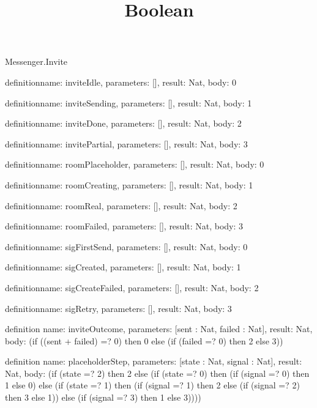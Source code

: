 \begin{lexlean}{Messenger.Invite}
\title{Boolean}
\begin{semanticmodule}
definition{name: inviteIdle, parameters: [], result: Nat, body: 0}

definition{name: inviteSending, parameters: [], result: Nat, body: 1}

definition{name: inviteDone, parameters: [], result: Nat, body: 2}

definition{name: invitePartial, parameters: [], result: Nat, body: 3}

definition{name: roomPlaceholder, parameters: [], result: Nat, body: 0}

definition{name: roomCreating, parameters: [], result: Nat, body: 1}

definition{name: roomReal, parameters: [], result: Nat, body: 2}

definition{name: roomFailed, parameters: [], result: Nat, body: 3}

definition{name: sigFirstSend, parameters: [], result: Nat, body: 0}

definition{name: sigCreated, parameters: [], result: Nat, body: 1}

definition{name: sigCreateFailed, parameters: [], result: Nat, body: 2}

definition{name: sigRetry, parameters: [], result: Nat, body: 3}

definition{
  name: inviteOutcome,
  parameters: [sent : Nat, failed : Nat],
  result: Nat,
  body: (if ((sent + failed) =? 0) then 0 else (if (failed =? 0) then 2 else 3))
}

definition{
  name: placeholderStep,
  parameters: [state : Nat, signal : Nat],
  result: Nat,
  body: (if (state =? 2) then 2 else (if (state =? 0) then (if (signal =? 0) then 1 else 0) else (if (state =? 1) then (if (signal =? 1) then 2 else (if (signal =? 2) then 3 else 1)) else (if (signal =? 3) then 1 else 3))))
}
\end{semanticmodule}
\end{lexlean}
